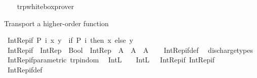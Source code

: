 \begin{isabellebody}
%
\isadelimproof
\ \ %
\endisadelimproof
%
\isatagproof
{}\isamarkupfalse%
\ trp{\isacharunderscore}{\kern0pt}whitebox{\isacharunderscore}{\kern0pt}prover%
\endisatagproof
{\isafoldproof}%
%
\isadelimproof
%
\endisadelimproof
%
\begin{isamarkuptext}%
Transport a higher-order function%
\end{isamarkuptext}\isamarkuptrue%
\isamarkupfalse%
\ {\isachardoublequoteopen}Int{\isacharunderscore}{\kern0pt}Rep{\isacharunderscore}{\kern0pt}if\ P\ i\ x\ y\ {\isasymequiv}\ if\ P\ i\ then\ x\ else\ y{\isachardoublequoteclose}\isanewline
\isanewline
{}\isamarkupfalse%
\ {\isachardoublequoteopen}Int{\isacharunderscore}{\kern0pt}Rep{\isacharunderscore}{\kern0pt}if\ {\isacharcolon}{\kern0pt}\ {\isacharparenleft}{\kern0pt}Int{\isacharunderscore}{\kern0pt}Rep\ {\isasymRightarrow}\ Bool{\isacharparenright}{\kern0pt}\ {\isasymRightarrow}\ Int{\isacharunderscore}{\kern0pt}Rep\ {\isasymRightarrow}\ A\ {\isasymRightarrow}\ A\ {\isasymRightarrow}\ A{\isachardoublequoteclose}\isanewline
%
\isadelimproof
\ \ %
\endisadelimproof
%
\isatagproof
{}\isamarkupfalse%
\ Int{\isacharunderscore}{\kern0pt}Rep{\isacharunderscore}{\kern0pt}if{\isacharunderscore}{\kern0pt}def\ \isamarkupfalse%
\ discharge{\isacharunderscore}{\kern0pt}types%
\endisatagproof
{\isafoldproof}%
%
\isadelimproof
\isanewline
%
\endisadelimproof
\isanewline
{}\isamarkupfalse%
\ Int{\isacharunderscore}{\kern0pt}Rep{\isacharunderscore}{\kern0pt}if{\isacharunderscore}{\kern0pt}parametric\ {\isacharbrackleft}{\kern0pt}trp{\isacharunderscore}{\kern0pt}in{\isacharunderscore}{\kern0pt}dom{\isacharbrackright}{\kern0pt}{\isacharcolon}{\kern0pt}\isanewline
\ \ {\isachardoublequoteopen}{\isacharparenleft}{\kern0pt}{\isacharparenleft}{\kern0pt}Int{\isachardot}{\kern0pt}L\ {\isasymRrightarrow}\ {\isacharparenleft}{\kern0pt}{\isasymlongleftrightarrow}{\isacharparenright}{\kern0pt}{\isacharparenright}{\kern0pt}\ {\isasymRrightarrow}\ Int{\isachardot}{\kern0pt}L\ {\isasymRrightarrow}\ {\isacharparenleft}{\kern0pt}{\isacharequal}{\kern0pt}{\isacharparenright}{\kern0pt}{\isacharparenright}{\kern0pt}\ Int{\isacharunderscore}{\kern0pt}Rep{\isacharunderscore}{\kern0pt}if\ Int{\isacharunderscore}{\kern0pt}Rep{\isacharunderscore}{\kern0pt}if{\isachardoublequoteclose}\isanewline
%
\isadelimproof
\ \ %
\endisadelimproof
%
\isatagproof
{}\isamarkupfalse%
\ Int{\isacharunderscore}{\kern0pt}Rep{\isacharunderscore}{\kern0pt}if{\isacharunderscore}{\kern0pt}def\ \isamarkupfalse%

\end{isabellebody}
